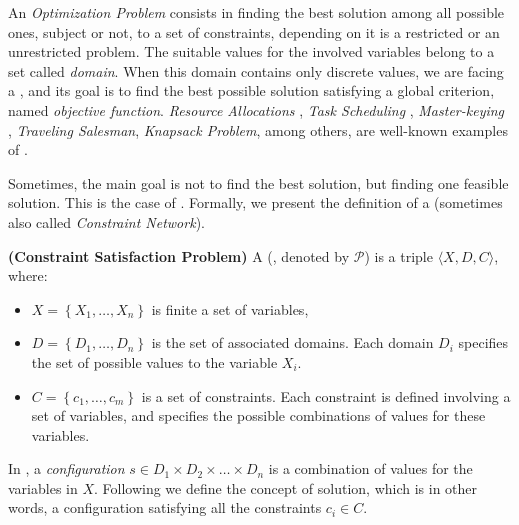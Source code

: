 An \textit{Optimization Problem} consists in finding the best solution among all possible ones, subject or not, to a set of constraints, depending on it is a restricted or an unrestricted problem. The suitable values for the involved variables belong to a set called {\it domain}. When this domain contains only discrete values, we are facing a \COP, and its goal is to find the best possible solution satisfying a global criterion, named {\it objective function}. {\it Resource Allocations} \cite{Akplogan2011}, \textit{Task Scheduling} \cite{Sibbesen2008}, \textit{Master-keying} \cite{Espelage2000}, \textit{Traveling Salesman}, \textit{Knapsack Problem}, among others, are well-known examples of \COPs{} \cite{Smith2005}.

Sometimes, the main goal is not to find the best solution, but finding one feasible solution. This is the case of \CSPs. Formally, we present the definition of a \csp{} (sometimes also called \textit{Constraint Network}). 

\begin{definition}{\bf (Constraint Satisfaction Problem)}
\label{def:csp}
A \CSP{} (\csp, denoted by $\mathcal{P}$) is a triple $\langle X,D,C \rangle$, where:
\begin{itemize}
\item $X = \left\{X_1,\ldots,X_n\right\}$ is finite a set of variables,
\item $D = \left\{D_1,\ldots, D_n\right\}$ is the set of associated domains. Each domain $D_i$ specifies the set of possible values to the variable $X_i$. %
\item $C = \left\{c_1,\ldots, c_m\right\}$ is a set of constraints. Each constraint is defined involving a set of variables, and specifies the possible combinations of values for these variables.
\end{itemize}
\end{definition}


In \csps, a \textit{configuration} $s\in D_1\times D_2\times\dots\times D_n$ is a combination of values for the variables in $X$. Following we define the concept of solution, which is in other words, a configuration satisfying all the constraints $c_i \in C$.

